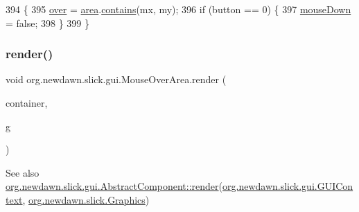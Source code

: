\begin{DoxyCode}
394                                                           \{
395         \mbox{\hyperlink{classorg_1_1newdawn_1_1slick_1_1gui_1_1_mouse_over_area_ac71b080e2b87f755f6e0fb54983877b1}{over}} = \mbox{\hyperlink{classorg_1_1newdawn_1_1slick_1_1gui_1_1_mouse_over_area_a8104ad89fbe457da294da3285b7a3268}{area}}.\mbox{\hyperlink{classorg_1_1newdawn_1_1slick_1_1geom_1_1_shape_ae9dcbe23fb1bcd01bac0ddcfe09685de}{contains}}(mx, my);
396         \textcolor{keywordflow}{if} (button == 0) \{
397             \mbox{\hyperlink{classorg_1_1newdawn_1_1slick_1_1gui_1_1_mouse_over_area_ad1eb1ead0d2c6b907c4b4d4a297da2c0}{mouseDown}} = \textcolor{keyword}{false}; 
398         \}
399     \}
\end{DoxyCode}
\mbox{\label{classorg_1_1newdawn_1_1slick_1_1gui_1_1_mouse_over_area_a37b442cacc81eec200efb0fa76d86fe0}} 
\subsubsection{\texorpdfstring{render()}{render()}}
{\footnotesize\ttfamily void org.\+newdawn.\+slick.\+gui.\+Mouse\+Over\+Area.\+render (\begin{DoxyParamCaption}\item[{\mbox{\hyperlink{interfaceorg_1_1newdawn_1_1slick_1_1gui_1_1_g_u_i_context}{G\+U\+I\+Context}}}]{container,  }\item[{\mbox{\hyperlink{classorg_1_1newdawn_1_1slick_1_1_graphics}{Graphics}}}]{g }\end{DoxyParamCaption})\hspace{0.3cm}{\ttfamily [inline]}}

\begin{DoxySeeAlso}{See also}
\mbox{\hyperlink{classorg_1_1newdawn_1_1slick_1_1gui_1_1_abstract_component_af2f66829fb28f1c9f27acfc6f1be2445}{org.\+newdawn.\+slick.\+gui.\+Abstract\+Component\+::render}}(\mbox{\hyperlink{interfaceorg_1_1newdawn_1_1slick_1_1gui_1_1_g_u_i_context}{org.\+newdawn.\+slick.\+gui.\+G\+U\+I\+Context}}, \mbox{\hyperlink{classorg_1_1newdawn_1_1slick_1_1_graphics}{org.\+newdawn.\+slick.\+Graphics}}) 
\end{DoxySeeAlso}

